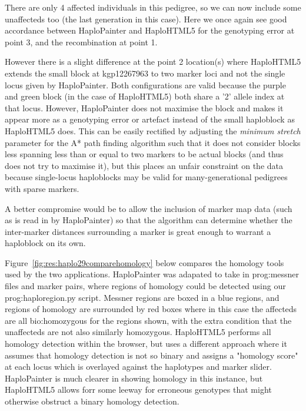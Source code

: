 \begin{spacing}{1.38}
There are only 4 affected individuals in this pedigree, so we can now include some unaffecteds too (the last  generation in this case). Here we once again see good accordance between HaploPainter and HaploHTML5 for the genotyping error at point 3, and the recombination at point 1. 

However there is a slight difference at the point 2 location(s) where HaploHTML5 extends the small block at kgp12267963 to two marker loci and not the single locus given by HaploPainter. Both configurations are valid because the purple and green block (in the case of HaploHTML5)  both  share a '2' allele index at that locus. However, HaploPainter does not maximise the block and makes it appear more as a genotyping error or artefact instead of the small haploblock as HaploHTML5 does. This can be easily rectified by adjusting the \textit{minimum stretch} parameter for the A* path finding algorithm such that it does not consider blocks less spanning less than or equal to two markers to be actual blocks (and thus does not try to maximise it), but this places an unfair constraint on the data because single-locus haploblocks may be valid for many-generational pedigrees with sparse markers.  

A better compromise would be to allow the inclusion of marker map data (such as is read in by HaploPainter) so that the algorithm can determine whether the inter-marker distances surrounding a marker is great enough to warrant a haploblock on its own.

Figure~\ref{fig:res:haplo29comparehomology} below compares the homology tools used by the two applications. HaploPainter was adapated to take in \gls{prog:messner} files and marker pairs, where regions of homology could be detected using our \gls{prog:haploregion.py} script. Messner regions are boxed in a blue regions, and regions of homology are surrounded by red boxes where in this case the affecteds are all \gls{bio:homozygous} for the regions shown, with the extra condition that the unaffecteds are not also similarly homozygous.
 HaploHTML5 performs all homology detection within the browser, but uses a different approach where it assumes that homology detection is not so binary and assigns a "homology score" at each locus which is overlayed against the haplotypes and marker slider. HaploPainter is much clearer in showing homology in this instance, but HaploHTML5 allows forr some leeway for erroneous genotypes that might otherwise obstruct a binary homology detection.
\end{spacing}

